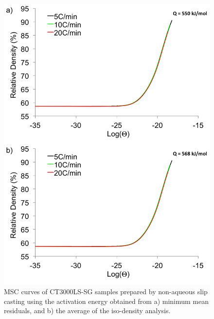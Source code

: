 \newpage
\begin{figure}[H]
	\centering
	\includegraphics[width=\textwidth]{Chapter-6/Figures/Figure6.png}
	\caption{MSC curves of CT3000LS-SG samples prepared by non-aqueous slip casting using the activation energy obtained from a) minimum mean residuals, and b) the average of the iso-density analysis.}
	\label{Ch6-figure:Figure6}
\end{figure}

